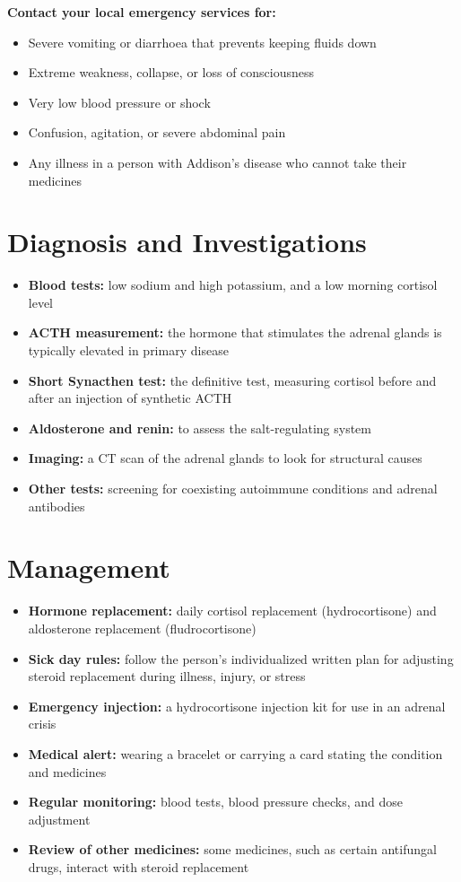 \textbf{Contact your local emergency services for:}
\begin{itemize}
    \item Severe vomiting or diarrhoea that prevents keeping fluids down
    \item Extreme weakness, collapse, or loss of consciousness
    \item Very low blood pressure or shock
    \item Confusion, agitation, or severe abdominal pain
    \item Any illness in a person with Addison's disease who cannot take their medicines
\end{itemize}

\section*{Diagnosis and Investigations}
\begin{itemize}
    \item \textbf{Blood tests:} low sodium and high potassium, and a low morning cortisol level
    \item \textbf{ACTH measurement:} the hormone that stimulates the adrenal glands is typically elevated in primary disease
    \item \textbf{Short Synacthen test:} the definitive test, measuring cortisol before and after an injection of synthetic ACTH
    \item \textbf{Aldosterone and renin:} to assess the salt-regulating system
    \item \textbf{Imaging:} a CT scan of the adrenal glands to look for structural causes
    \item \textbf{Other tests:} screening for coexisting autoimmune conditions and adrenal antibodies
\end{itemize}

\section*{Management}
\begin{itemize}
    \item \textbf{Hormone replacement:} daily cortisol replacement (hydrocortisone) and aldosterone replacement (fludrocortisone)
    \item \textbf{Sick day rules:} follow the person's individualized written plan for adjusting steroid replacement during illness, injury, or stress
    \item \textbf{Emergency injection:} a hydrocortisone injection kit for use in an adrenal crisis
    \item \textbf{Medical alert:} wearing a bracelet or carrying a card stating the condition and medicines
    \item \textbf{Regular monitoring:} blood tests, blood pressure checks, and dose adjustment
    \item \textbf{Review of other medicines:} some medicines, such as certain antifungal drugs, interact with steroid replacement
\end{itemize}

